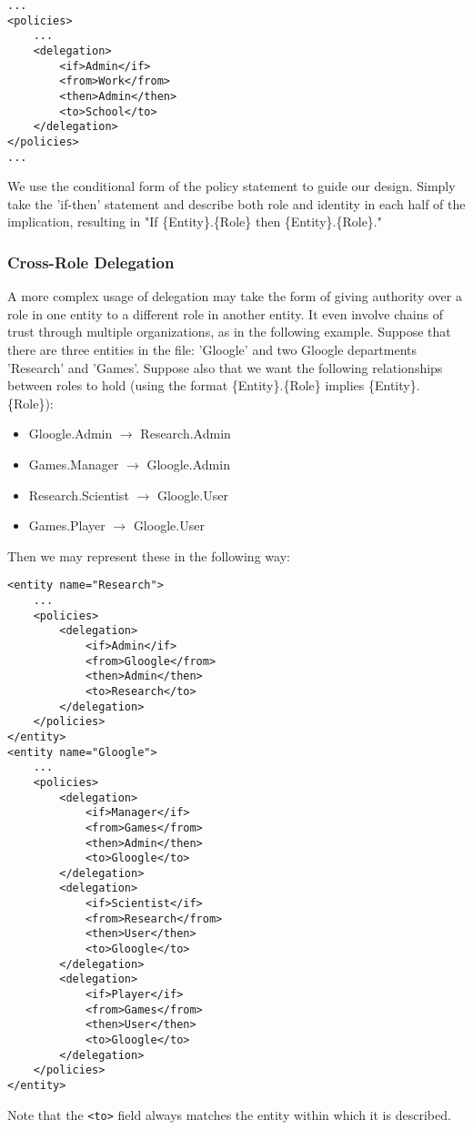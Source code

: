 \documentclass{article}
\providecommand{\tightlist}{
    \setlength{\itemsep}{1pt}\setlength{\parskip}{0pt}
}
\providecommand{\inlinecode}{\texttt}
\begin{document}
\begin{lstlisting}
...
<policies>
    ...
    <delegation>
        <if>Admin</if>
        <from>Work</from>
        <then>Admin</then>
        <to>School</to>
    </delegation>
</policies>
...
\end{lstlisting}
We use the conditional form of the policy statement to guide our design. Simply take the 'if-then' statement and describe both role and identity in each half of the implication, resulting in "If \{Entity\}.\{Role\} then \{Entity\}.\{Role\}."

\subsubsection{Cross-Role Delegation}
A more complex usage of delegation may take the form of giving authority over a role in one entity to a different role in another entity. It even involve chains of trust through multiple organizations, as in the following example. Suppose that there are three entities in the file: 'Gloogle' and two Gloogle departments 'Research' and 'Games'. Suppose also that we want the following relationships between roles to hold (using the format \{Entity\}.\{Role\} implies \{Entity\}.\{Role\}):
\begin{itemize}\tightlist
  \item Gloogle.Admin $\rightarrow$ Research.Admin
  \item Games.Manager $\rightarrow$ Gloogle.Admin
  \item Research.Scientist $\rightarrow$ Gloogle.User
  \item Games.Player $\rightarrow$ Gloogle.User
\end{itemize}
Then we may represent these in the following way:
\begin{lstlisting}
<entity name="Research">
    ...
    <policies>
        <delegation>
            <if>Admin</if>
            <from>Gloogle</from>
            <then>Admin</then>
            <to>Research</to>
        </delegation>
    </policies>
</entity>
<entity name="Gloogle">
    ...
    <policies>
        <delegation>
            <if>Manager</if>
            <from>Games</from>
            <then>Admin</then>
            <to>Gloogle</to>
        </delegation>
        <delegation>
            <if>Scientist</if>
            <from>Research</from>
            <then>User</then>
            <to>Gloogle</to>
        </delegation>
        <delegation>
            <if>Player</if>
            <from>Games</from>
            <then>User</then>
            <to>Gloogle</to>
        </delegation>
    </policies>
</entity>
\end{lstlisting}
Note that the \inlinecode{<to>} field always matches the entity within which it is described.
\end{document}
